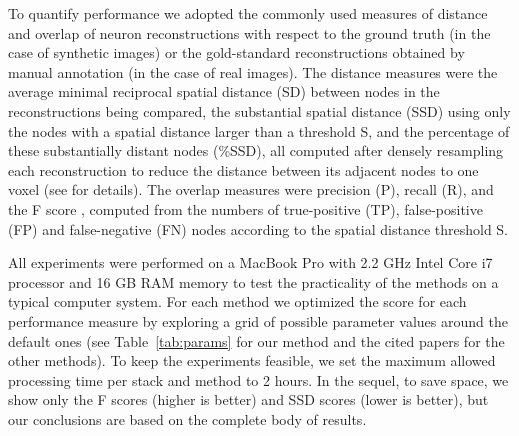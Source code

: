 To quantify performance we adopted the commonly used measures of distance and overlap of neuron reconstructions with respect to the ground truth (in the case of synthetic images) or the gold-standard reconstructions obtained by manual annotation (in the case of real images). The distance measures were the average minimal reciprocal spatial distance (SD) between nodes in the reconstructions being compared, the substantial spatial distance (SSD) using only the nodes with a spatial distance larger than a threshold S, and the percentage of these substantially distant nodes (\%SSD), all computed after densely resampling each reconstruction to reduce the distance between its adjacent nodes to one voxel (see \cite{peng2010v3d} for details). The overlap measures were precision (P), recall (R), and the F score \cite{powers2011evaluation}, computed from the numbers of true-positive (TP), false-positive (FP) and false-negative (FN) nodes according to the spatial distance threshold S.

All experiments were performed on a MacBook Pro with 2.2 GHz Intel Core i7 processor and 16 GB RAM memory to test the practicality of the methods on a typical computer system. For each method we optimized the score for each performance measure by exploring a grid of possible parameter values around the default ones (see Table~\ref{tab:params} for our method and the cited papers for the other methods). To keep the experiments feasible, we set the maximum allowed processing time per stack and method to 2 hours. In the sequel, to save space, we show only the F scores (higher is better) and SSD scores (lower is better), but our conclusions are based on the complete body of results.

